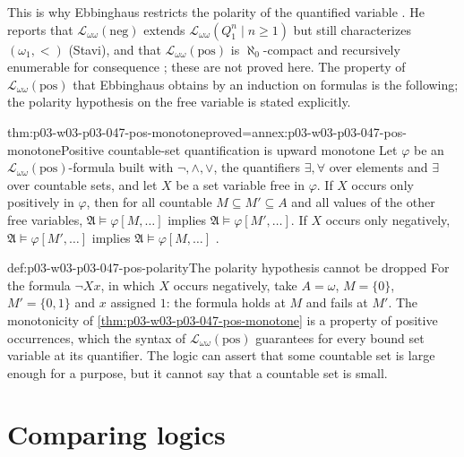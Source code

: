 This is why Ebbinghaus restricts the polarity of the quantified variable
\cite[Ch.~II, \S2.2, Example~3, p.~36]{Ebbinghaus1985ExtendedLogics}.
He reports that \(\mathscr L_{\omega\omega}(\mathrm{neg})\) extends
\(\mathscr L_{\omega\omega}(Q_1^n\mid n\ge1)\) but still characterizes
\((\omega_1,<)\) (Stavi), and that \(\mathscr L_{\omega\omega}(\mathrm{pos})\)
is \(\aleph_0\)-compact and recursively enumerable for consequence
\cite[Ch.~II, \S2.2, Example~3, p.~36]{Ebbinghaus1985ExtendedLogics}; these
are not proved here.  The property of \(\mathscr L_{\omega\omega}(\mathrm{pos})\)
that Ebbinghaus obtains by an induction on formulas is the following; the
polarity hypothesis on the free variable is stated explicitly.

\begin{hbtheorem}{thm:p03-w03-p03-047-pos-monotone}{proved=annex:p03-w03-p03-047-pos-monotone}{Positive countable-set quantification is upward monotone}
Let \(\varphi\) be an \(\mathscr L_{\omega\omega}(\mathrm{pos})\)-formula
built with \(\neg,\land,\lor\), the quantifiers \(\exists,\forall\) over
elements and \(\exists\) over countable sets, and let \(X\) be a set variable
free in \(\varphi\).  If \(X\) occurs only positively in \(\varphi\), then for
all countable \(M\subseteq M'\subseteq A\) and all values of the other free
variables, \(\mathfrak A\models\varphi[M,\ldots]\) implies
\(\mathfrak A\models\varphi[M',\ldots]\).  If \(X\) occurs only negatively,
\(\mathfrak A\models\varphi[M',\ldots]\) implies
\(\mathfrak A\models\varphi[M,\ldots]\)
\cite[Ch.~II, \S2.2, Example~3, p.~36]{Ebbinghaus1985ExtendedLogics}.
\end{hbtheorem}

\begin{hbwarning}{def:p03-w03-p03-047-pos-polarity}{The polarity hypothesis cannot be dropped}
For the formula \(\neg Xx\), in which \(X\) occurs negatively, take
\(A=\omega\), \(M=\{0\}\), \(M'=\{0,1\}\) and \(x\) assigned \(1\): the
formula holds at \(M\) and fails at \(M'\).  The monotonicity of
\cref{thm:p03-w03-p03-047-pos-monotone} is a property of positive
occurrences, which the syntax of \(\mathscr L_{\omega\omega}(\mathrm{pos})\)
guarantees for every bound set variable at its quantifier.  The logic can
assert that some countable set is large enough for a purpose, but it cannot
say that a countable set is small.
\end{hbwarning}

\section{Comparing logics}
\label{sec:p03-w03-p03-047-comparing}

